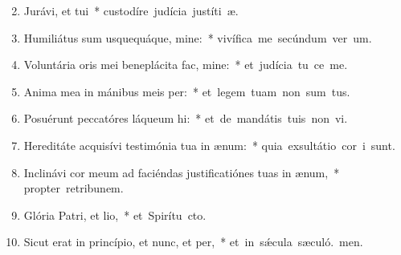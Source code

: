 \begin{flushleft}
\begin{enumerate}[leftmargin=*]
\setcounter{enumi}{1}

\item Jurávi, et tui~* \mbox{custodíre judícia justíti æ.}
\item Humiliátus sum usquequáque, mine:~* \mbox{vivífica me secúndum ver um.}
\item Voluntária oris mei beneplácita fac, mine:~* \mbox{et judícia tu ce me.}
\item Anima mea in mánibus meis per:~* \mbox{et legem tuam non sum tus.}
\item Posuérunt peccatóres láqueum hi:~* \mbox{et de mandátis tuis non vi.}
\item Hereditáte acquisívi testimónia tua in ænum:~* \mbox{quia exsultátio cor i sunt.}
\item Inclinávi cor meum ad faciéndas justificatiónes tuas in ænum,~* \mbox{propter retribunem.}
\item Glória Patri, et lio,~* \mbox{et Spirítu cto.}
\item Sicut erat in princípio, et nunc, et per,~* \mbox{et in s\'{\ae}cula sæculó. men.}

\end{enumerate}
\end{flushleft}

